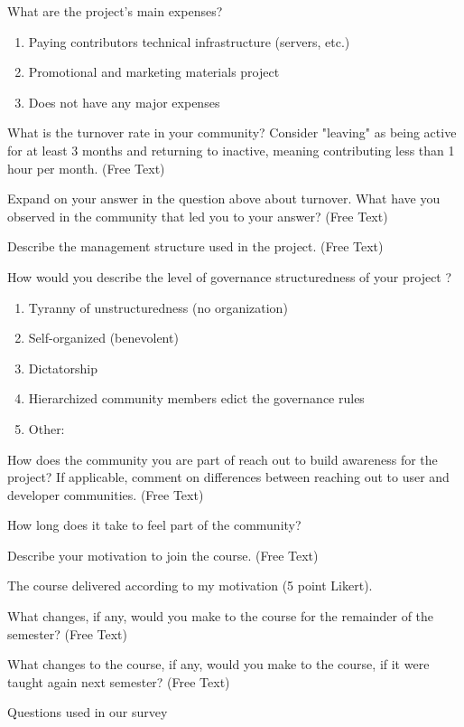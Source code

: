 \begin{table}
What are the project's main expenses?
\begin{enumerate}
\item Paying contributors technical infrastructure (servers, etc.)
\item Promotional and marketing materials project
\item Does not have any major expenses
\end{enumerate}

What is the turnover rate in your community? Consider "leaving" as being active for at least 3 months and returning to inactive, meaning contributing less than 1 hour per month. (Free Text)

Expand on your answer in the question above about turnover. What have you observed in the community that led you to your answer? (Free Text)

Describe the management structure used in the project. (Free Text)

How would you describe the level of governance structuredness of your project ?
\begin{enumerate}
\item Tyranny of unstructuredness (no organization)
\item Self-organized (benevolent)
\item Dictatorship
\item Hierarchized community members edict the governance rules
\item Other:
\end{enumerate}

How does the community you are part of reach out to build awareness for the project? If applicable, comment on differences between reaching out to user and developer communities. (Free Text)

How long does it take to feel part of the community?

Describe your motivation to join the course. (Free Text)

The course delivered according to my motivation (5 point Likert).

What changes, if any, would you make to the course for the remainder of the semester? (Free Text)

What changes to the course, if any, would you make to the course, if it were taught again next semester? (Free Text)

\caption{Questions used in our survey}
\label{tab:survey_question}
\end{table}